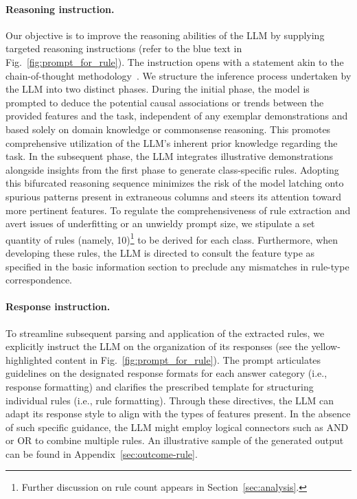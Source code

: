 \paragraph{Reasoning instruction.} Our objective is to improve the reasoning abilities of the LLM by supplying targeted reasoning instructions (refer to the blue text in Fig.~\ref{fig:prompt_for_rule}). The instruction opens with a statement akin to the chain-of-thought methodology~\cite{wei2022chain}. We structure the inference process undertaken by the LLM into two distinct phases. During the initial phase, the model is prompted to deduce the potential causal associations or trends between the provided features and the task, independent of any exemplar demonstrations and based solely on domain knowledge or commonsense reasoning. This promotes comprehensive utilization of the LLM's inherent prior knowledge regarding the task. In the subsequent phase, the LLM integrates illustrative demonstrations alongside insights from the first phase to generate class-specific rules. Adopting this bifurcated reasoning sequence minimizes the risk of the model latching onto spurious patterns present in extraneous columns and steers its attention toward more pertinent features. To regulate the comprehensiveness of rule extraction and avert issues of underfitting or an unwieldy prompt size, we stipulate a set quantity of rules (namely, 10)\footnote{Further discussion on rule count appears in Section~\ref{sec:analysis}.} to be derived for each class. Furthermore, when developing these rules, the LLM is directed to consult the feature type as specified in the basic information section to preclude any mismatches in rule-type correspondence.

\vspace*{-0.12in}
\paragraph{Response instruction.} To streamline subsequent parsing and application of the extracted rules, we explicitly instruct the LLM on the organization of its responses (see the yellow-highlighted content in Fig.~\ref{fig:prompt_for_rule}). The prompt articulates guidelines on the designated response formats for each answer category (i.e., response formatting) and clarifies the prescribed template for structuring individual rules (i.e., rule formatting). Through these directives, the LLM can adapt its response style to align with the types of features present. In the absence of such specific guidance, the LLM might employ logical connectors such as AND or OR to combine multiple rules. An illustrative sample of the generated output can be found in Appendix~\ref{sec:outcome-rule}.


